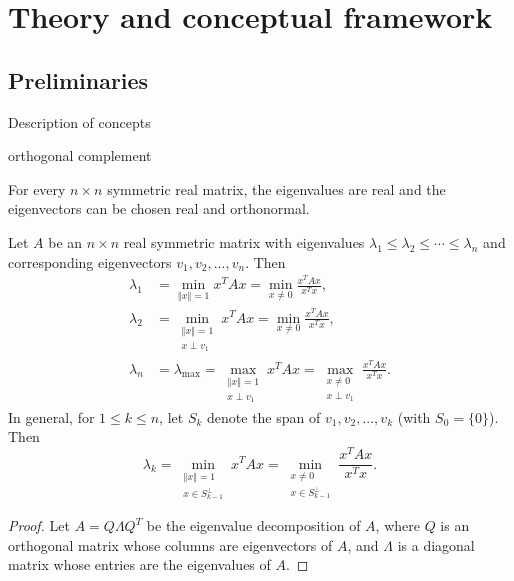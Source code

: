 %
%
\let\textcircled=\pgftextcircled
\chapter{Theory and conceptual framework}
\label{Chapter2}

\section{Preliminaries}
Description of concepts


\begin{definition}
orthogonal complement
\end{definition}

\begin{theorem}
	For every $n\times n$ symmetric real matrix, the eigenvalues are real and the eigenvectors can be chosen real and orthonormal.
\end{theorem}

\begin{theorem}
Let $A$ be an $n\times n$ real symmetric matrix with eigenvalues $\lambda_1 \leq \lambda_2 \leq \cdots \leq \lambda_n$ and corresponding eigenvectors $v_1, v_2,..., v_n$. Then 
\begin{align*}
	\lambda_1 &= \min_{\left \Vert x\right\Vert = 1} x^TAx = \min_{ x \neq 0} \frac{x^TAx}{x^Tx}, \\
	\lambda_2 &= \min_{\substack{\left \Vert x\right\Vert = 1 \\ x\perp v_1}} x^TAx = \min_{ x \neq 0} \frac{x^TAx}{x^Tx}, \\
	\lambda_n &= \lambda_{\text{max}} = \max_{\substack{\left \Vert x\right\Vert = 1 \\ x\perp v_1}} x^TAx = \max_{\substack{ x \neq 0 \\ x\perp v_1}} \frac{x^TAx}{x^Tx}.
\end{align*}
In general, for $1\leq k \leq n$, let $S_k$ denote the span of $v_1, v_2,..., v_k$ (with $S_0=\{0\}$). Then 
\begin{displaymath}
	\lambda_k = \min_{\substack{\left \Vert x\right\Vert = 1 \\ x\in S_{k-1}^\perp}} x^TAx = \min_{\substack{x \neq 0 \\ x\in S_{k-1}^\perp}} \frac{x^TAx}{x^Tx}.
\end{displaymath}
\end{theorem}
\begin{proof}
	Let $A=Q\Lambda Q^T$ be the eigenvalue decomposition of $A$, where $Q$ is an orthogonal matrix whose columns are eigenvectors of $A$, and $\Lambda$ is a diagonal matrix whose entries are the eigenvalues of $A$.
\end{proof}

